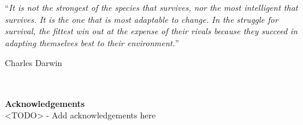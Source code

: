 \documentclass[
	12pt, %
	fleqn, %
	a4paper, %
]{LegrandOrangeBook}
\begin{document}

\thispagestyle{empty} %

\noindent\enquote{\itshape It is not the strongest of the species that survives, nor the most intelligent that survives. It is the one that is most adaptable to change. In the struggle for survival, the fittest win out at the expense of their rivals because they succeed in adapting themselves best to their environment.}\bigbreak

\hfill Charles Darwin


~\vfill %

\noindent \textbf{Acknowledgements} \\
<TODO> - Add acknowledgements here



\pagestyle{empty} %

\tableofcontents %

\listoffigures %

\listoftables %

\pagestyle{fancy} %

\cleardoublepage %

\chapterimage{}
\chapterspaceabove{6.75cm} 
\chapterspacebelow{7.25cm}


\chapterimage{}
\chapterspaceabove{6.75cm}
\chapterspacebelow{7.25cm} 

\end{document}
